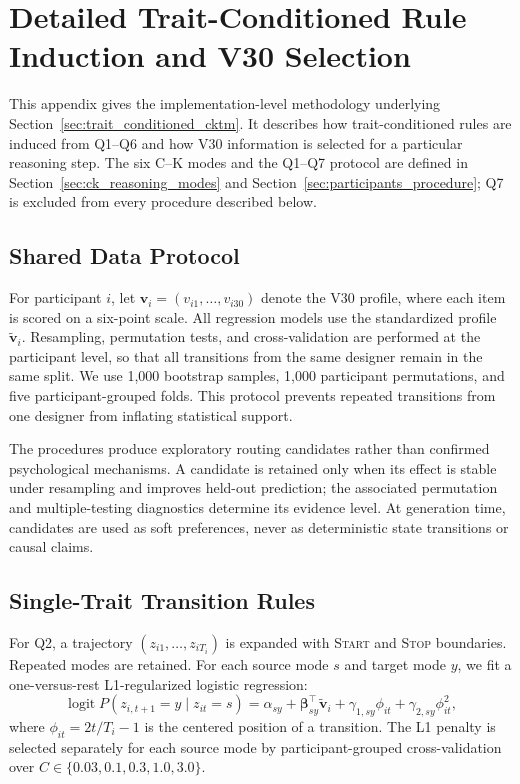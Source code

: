 \section{Detailed Trait-Conditioned Rule Induction and V30 Selection}
\label{app:trait_conditioned_details}

This appendix gives the implementation-level methodology underlying Section~\ref{sec:trait_conditioned_cktm}. It describes how trait-conditioned rules are induced from Q1--Q6 and how V30 information is selected for a particular reasoning step. The six C--K modes and the Q1--Q7 protocol are defined in Section~\ref{sec:ck_reasoning_modes} and Section~\ref{sec:participants_procedure}; Q7 is excluded from every procedure described below.

\subsection{Shared Data Protocol}

For participant $i$, let $\mathbf v_i=(v_{i1},\ldots,v_{i30})$ denote the V30 profile, where each item is scored on a six-point scale. All regression models use the standardized profile $\widetilde{\mathbf v}_i$. Resampling, permutation tests, and cross-validation are performed at the participant level, so that all transitions from the same designer remain in the same split. We use 1,000 bootstrap samples, 1,000 participant permutations, and five participant-grouped folds. This protocol prevents repeated transitions from one designer from inflating statistical support.

The procedures produce exploratory routing candidates rather than confirmed psychological mechanisms. A candidate is retained only when its effect is stable under resampling and improves held-out prediction; the associated permutation and multiple-testing diagnostics determine its evidence level. At generation time, candidates are used as soft preferences, never as deterministic state transitions or causal claims.

\subsection{Single-Trait Transition Rules}

For Q2, a trajectory $(z_{i1},\ldots,z_{iT_i})$ is expanded with \textsc{Start} and \textsc{Stop} boundaries. Repeated modes are retained. For each source mode $s$ and target mode $y$, we fit a one-versus-rest L1-regularized logistic regression:
\begin{equation}
\operatorname{logit} P(z_{i,t+1}=y\mid z_{it}=s)
= \alpha_{sy}+\boldsymbol\beta_{sy}^{\top}\widetilde{\mathbf v}_i
+\gamma_{1,sy}\phi_{it}+\gamma_{2,sy}\phi_{it}^{2},
\label{eq:app_univariate_transition}
\end{equation}
where $\phi_{it}=2t/T_i-1$ is the centered position of a transition. The L1 penalty is selected separately for each source mode by participant-grouped cross-validation over $C\in\{0.03,0.1,0.3,1.0,3.0\}$.

